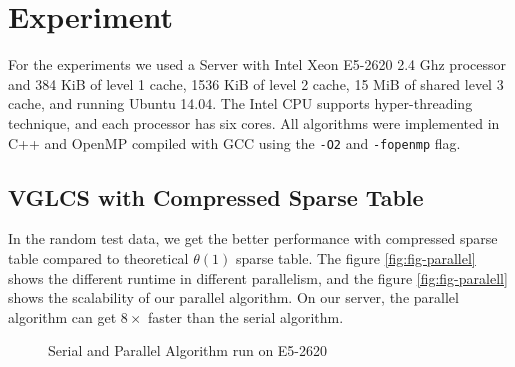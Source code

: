 \section{Experiment}
\label{sec:Experiment}

For the experiments we used a Server with Intel Xeon E5-2620 2.4 Ghz
processor and 384 KiB of level 1 cache, 1536 KiB of level 2 cache, 15
MiB of shared level 3 cache, and running Ubuntu 14.04.  The Intel CPU
supports hyper-threading technique, and each processor has six cores.
All algorithms were implemented in C++ and OpenMP compiled with GCC
using the \texttt{-O2} and \texttt{-fopenmp} flag.

\iffalse
我們運行在 Intel Xeon E5-2620 2.40 GHz 主機上，其擁有 L1 cache 384 KiB、L2 cache 1536 KiB 和 L3 cache 15 MiB，
Intel CPU 同時也支持 hyper-threading 技術，每個處理器有 6 個實體核心。
所有的演算法使用 C++ 和 OpenMP 實作，使用優化參數為 \texttt{-O2} 和 \textt{-fopenmp}。
\fi

\subsection{VGLCS with Compressed Sparse Table}

In the random test data, we get the better performance with compressed
sparse table compared to theoretical $\theta(1)$ sparse table.  The
figure \ref{fig:fig-parallel} shows the different runtime in different
parallelism, and the figure \ref{fig:fig-paralell} shows the
scalability of our parallel algorithm.  On our server, the parallel
algorithm can get $8 \times$ faster than the serial algorithm.

\iffalse
我們運行優化策略中的空間壓縮版本，而非理論分析的 $\theta(1)$ 操作，
單次詢問落在 $O(s)$ 中，在實作上由於可以完全壓在暫存器上操作，效能表現較佳。
\fi

\begin{figure}[!thb]
  \centering
  \caption{Serial and Parallel Algorithm run on E5-2620}
\end{figure}


